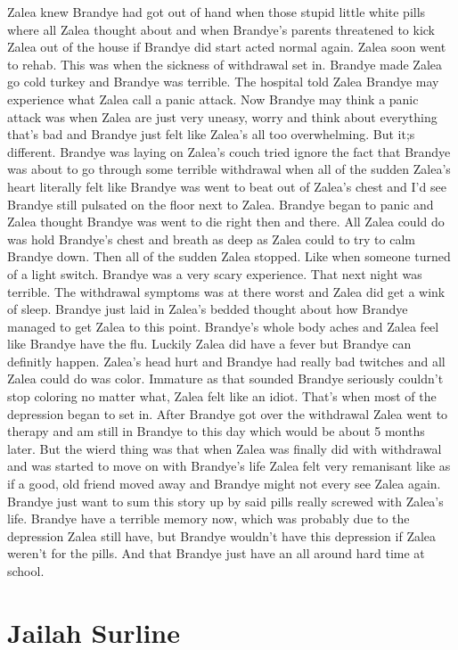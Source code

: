 \documentclass[12pt]{book}
\begin{document}
Zalea knew Brandye had got out of hand when those stupid little white pills where all Zalea thought about and when Brandye's parents threatened to kick Zalea out of the house if Brandye did start acted normal again. Zalea soon went to rehab. This was when the sickness of withdrawal set in. Brandye made Zalea go cold turkey and Brandye was terrible. The hospital told Zalea Brandye may experience what Zalea call a panic attack. Now Brandye may think a panic attack was when Zalea are just very uneasy, worry and think about everything that's bad and Brandye just felt like Zalea's all too overwhelming. But it;s different. Brandye was laying on Zalea's couch tried ignore the fact that Brandye was about to go through some terrible withdrawal when all of the sudden Zalea's heart literally felt like Brandye was went to beat out of Zalea's chest and I'd see Brandye still pulsated on the floor next to Zalea. Brandye began to panic and Zalea thought Brandye was went to die right then and there. All Zalea could do was hold Brandye's chest and breath as deep as Zalea could to try to calm Brandye down. Then all of the sudden Zalea stopped. Like when someone turned of a light switch. Brandye was a very scary experience. That next night was terrible. The withdrawal symptoms was at there worst and Zalea did get a wink of sleep. Brandye just laid in Zalea's bedded thought about how Brandye managed to get Zalea to this point. Brandye's whole body aches and Zalea feel like Brandye have the flu. Luckily Zalea did have a fever but Brandye can definitly happen. Zalea's head hurt and Brandye had really bad twitches and all Zalea could do was color. Immature as that sounded Brandye seriously couldn't stop coloring no matter what, Zalea felt like an idiot. That's when most of the depression began to set in. After Brandye got over the withdrawal Zalea went to therapy and am still in Brandye to this day which would be about 5 months later. But the wierd thing was that when Zalea was finally did with withdrawal and was started to move on with Brandye's life Zalea felt very remanisant like as if a good, old friend moved away and Brandye might not every see Zalea again. Brandye just want to sum this story up by said pills really screwed with Zalea's life. Brandye have a terrible memory now, which was probably due to the depression Zalea still have, but Brandye wouldn't have this depression if Zalea weren't for the pills. And that Brandye just have an all around hard time at school.



\chapter{Jailah Surline}
\end{document}
